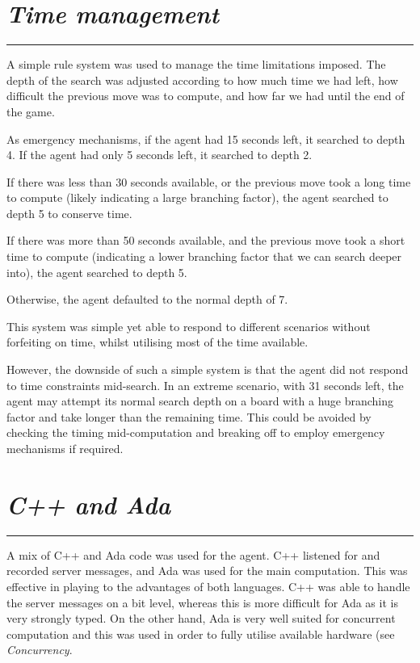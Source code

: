 \documentclass[10pt]{report}
\begin{document}
\begin{multicols}{2}
\section*{\emph{Time management}}
\hrule

A simple rule system was used to manage the time limitations imposed. The depth of the search was adjusted according to how much time we had left, how difficult the previous move was to compute, and how far we had until the end of the game.

As emergency mechanisms, if the agent had 15 seconds left, it searched to depth 4. If the agent had only 5 seconds left, it searched to depth 2.

If there was less than 30 seconds available, or the previous move took a long time to compute (likely indicating a large branching factor), the agent searched to depth 5 to conserve time.

If there was more than 50 seconds available, and the previous move took a short time to compute (indicating a lower branching factor that we can search deeper into), the agent searched to depth 5.

Otherwise, the agent defaulted to the normal depth of 7.

This system was simple yet able to respond to different scenarios without forfeiting on time, whilst utilising most of the time available.

However, the downside of such a simple system is that the agent did not respond to time constraints mid-search. In an extreme scenario, with 31 seconds left, the agent may attempt its normal search depth on a board with a huge branching factor and take longer than the remaining time. This could be avoided by checking the timing mid-computation and breaking off to employ emergency mechanisms if required.

\section*{\emph{C++ and Ada}}
\hrule
A mix of C++ and Ada code was used for the agent. C++ listened for and recorded server messages, and Ada was used for the main computation. This was effective in playing to the advantages of both languages. C++ was able to handle the server messages on a bit level, whereas this is more difficult for Ada as it is very strongly typed. On the other hand, Ada is very well suited for concurrent computation and this was used in order to fully utilise available hardware (see \emph{Concurrency}.


\end{multicols}
\end{document}

